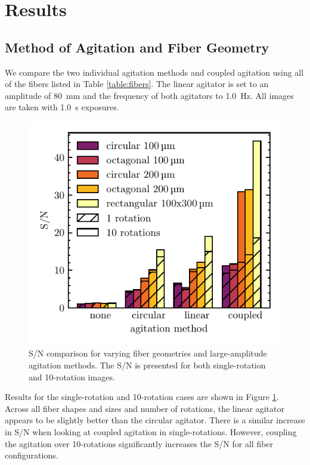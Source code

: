 \section{Results}
\label{modal-noise:results}

\subsection{Method of Agitation and Fiber Geometry}
\label{modal-noise:results:ag-snr}

We compare the two individual agitation methods and coupled agitation using all of the fibers listed in Table \ref{table:fibers}. The linear agitator is set to an amplitude of \SI{80}{\milli\meter} and the frequency of both agitators to \SI{1.0}{\hertz}. All images are taken with \SI{1.0}{\second} exposures.

\begin{figure}
\centering
	\includegraphics[width=0.7\columnwidth]{figures-2/ag_snr.pdf}
	\caption[Signal-to-noise comparison across fiber geometry and agitation method]{S/N comparison for varying fiber geometries and large-amplitude agitation methods. The S/N is presented for both single-rotation and 10-rotation images.}
\label{fig:ag_snr}
\end{figure}

Results for the single-rotation and 10-rotation cases are shown in Figure \ref{fig:ag_snr}. Across all fiber shapes and sizes and number of rotations, the linear agitator appears to be slightly better than the circular agitator. There is a similar increase in S/N when looking at coupled agitation in single-rotations. However, coupling the agitation over 10-rotations significantly increases the S/N for all fiber configurations.

